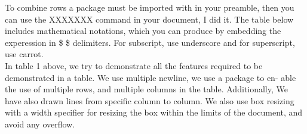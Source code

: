 \documentclass[a4paper,12pt]{extarticle}
\begin{document}
 To combine rows a package must be imported with in your preamble, then you can use the XXXXXXX command in your document, I did it. The table below \space includes mathematical notations, \space which you can produce by embedding the experession in \$ \$ delimiters. \space For subscript, use underscore and for superscript, use carrot.\\

{\Large In table 1 above, we try to demonstrate all the
features required to be demonstrated in a table.
We use multiple newline, we use a package to en-
able the use of multiple rows, and multiple columns
in the table. \space Additionally, We have also drawn
lines from specific column to column. We also use
box resizing with a width specifier for resizing the
box within the limits of the document, and avoid
any overflow.\\} 
\end{document}

